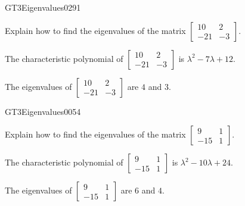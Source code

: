 \newpage




\begin{exercise}{GT3}{Eigenvalues}{0291} 
\begin{exerciseStatement} 

Explain how to find the eigenvalues of the matrix \(\left[\begin{array}{cc}
10 & 2 \\
-21 & -3
\end{array}\right]\).

 \end{exerciseStatement}
 \begin{exerciseAnswer} 

The characteristic polynomial of \(\left[\begin{array}{cc}
10 & 2 \\
-21 & -3
\end{array}\right]\) is \(\lambda^{2} - 7 \lambda + 12\).

 

The eigenvalues of \(\left[\begin{array}{cc}
10 & 2 \\
-21 & -3
\end{array}\right]\) are \(4\) and \(3\).

 \end{exerciseAnswer}
 \end{exercise}



\begin{exercise}{GT3}{Eigenvalues}{0054} 
\begin{exerciseStatement} 

Explain how to find the eigenvalues of the matrix \(\left[\begin{array}{cc}
9 & 1 \\
-15 & 1
\end{array}\right]\).

 \end{exerciseStatement}
 \begin{exerciseAnswer} 

The characteristic polynomial of \(\left[\begin{array}{cc}
9 & 1 \\
-15 & 1
\end{array}\right]\) is \(\lambda^{2} - 10 \lambda + 24\).

 

The eigenvalues of \(\left[\begin{array}{cc}
9 & 1 \\
-15 & 1
\end{array}\right]\) are \(6\) and \(4\).

 \end{exerciseAnswer}
 \end{exercise}


